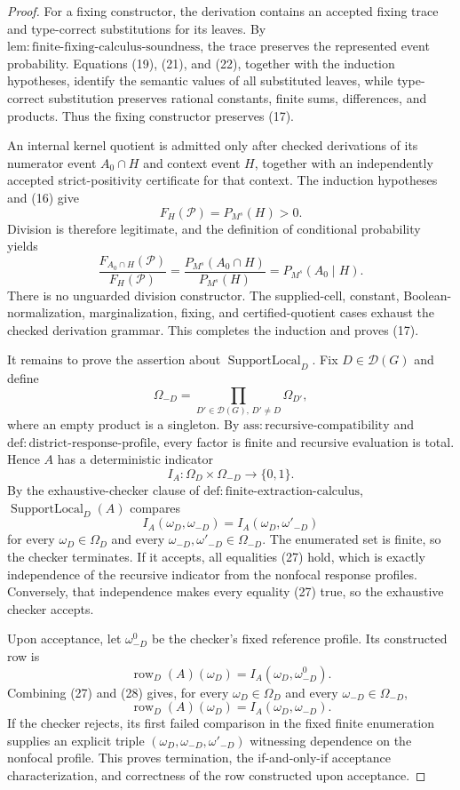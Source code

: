 \documentclass{article}
\begin{document}
\begin{proof}
For a fixing constructor, the derivation contains an accepted fixing trace and type-correct substitutions for its leaves. By \(\mathrm{lem:finite\text{-}fixing\text{-}calculus\text{-}soundness}\), the trace preserves the represented event probability. Equations (19), (21), and (22), together with the induction hypotheses, identify the semantic values of all substituted leaves, while type-correct substitution preserves rational constants, finite sums, differences, and products. Thus the fixing constructor preserves (17).

An internal kernel quotient is admitted only after checked derivations of its numerator event \(A_0\cap H\) and context event \(H\), together with an independently accepted strict-positivity certificate for that context. The induction hypotheses and (16) give
\[
 F_H(\mathcal P)=P_{M^s}(H)>0.
\tag{23}
\]
Division is therefore legitimate, and the definition of conditional probability yields
\[
 \frac{F_{A_0\cap H}(\mathcal P)}{F_H(\mathcal P)}
 =\frac{P_{M^s}(A_0\cap H)}{P_{M^s}(H)}
 =P_{M^s}(A_0\mid H).
\tag{24}
\]
There is no unguarded division constructor. The supplied-cell, constant, Boolean-normalization, marginalization, fixing, and certified-quotient cases exhaust the checked derivation grammar. This completes the induction and proves (17).

It remains to prove the assertion about \(\operatorname{SupportLocal}_D\). Fix \(D\in\mathcal D(G)\) and define
\[
 \Omega_{-D}
 =\prod_{D'\in\mathcal D(G),\,D'\ne D}\Omega_{D'},
\tag{25}
\]
where an empty product is a singleton. By \(\mathrm{ass:recursive\text{-}compatibility}\) and \(\mathrm{def:district\text{-}response\text{-}profile}\), every factor is finite and recursive evaluation is total. Hence \(A\) has a deterministic indicator
\[
 I_A:\Omega_D\times\Omega_{-D}\longrightarrow\{0,1\}.
\tag{26}
\]
By the exhaustive-checker clause of \(\mathrm{def:finite\text{-}extraction\text{-}calculus}\), \(\operatorname{SupportLocal}_D(A)\) compares
\[
 I_A(\omega_D,\omega_{-D})
 =I_A(\omega_D,\omega'_{-D})
\tag{27}
\]
for every \(\omega_D\in\Omega_D\) and every \(\omega_{-D},\omega'_{-D}\in\Omega_{-D}\). The enumerated set is finite, so the checker terminates. If it accepts, all equalities (27) hold, which is exactly independence of the recursive indicator from the nonfocal response profiles. Conversely, that independence makes every equality (27) true, so the exhaustive checker accepts.

Upon acceptance, let \(\omega_{-D}^{0}\) be the checker's fixed reference profile. Its constructed row is
\[
 \operatorname{row}_D(A)(\omega_D)
 =I_A(\omega_D,\omega_{-D}^{0}).
\tag{28}
\]
Combining (27) and (28) gives, for every \(\omega_D\in\Omega_D\) and every \(\omega_{-D}\in\Omega_{-D}\),
\[
 \operatorname{row}_D(A)(\omega_D)
 =I_A(\omega_D,\omega_{-D}).
\]
If the checker rejects, its first failed comparison in the fixed finite enumeration supplies an explicit triple \((\omega_D,\omega_{-D},\omega'_{-D})\) witnessing dependence on the nonfocal profile. This proves termination, the if-and-only-if acceptance characterization, and correctness of the row constructed upon acceptance.
\end{proof}
\end{document}
